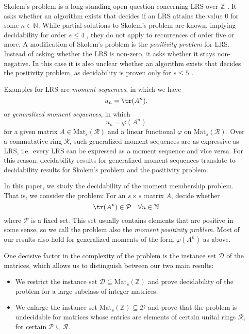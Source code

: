 Skolem's problem is a long-standing open question concerning LRS over $\mathbb{Z}$ \cite{Ou12}. It asks whether an algorithm exists that decides if an LRS attains the value $0$ for some $n \in \mathbb{N}$.
While partial solutions to Skolem's problem are known, implying decidability for order $s \leqslant 4$ \cite{Ti84, Ve85}, they do not apply to recurrences of order five or more.
A modification of Skolem's problem is the \emph{positivity problem} for LRS. Instead of asking whether the LRS is non-zero, it asks whether it stays non-negative.
In this case it is also unclear whether an algorithm exists that decides the positivity problem, as decidability is proven only for $s \leqslant 5$ \cite{OW, OW2}.

Examples for LRS are \emph{moment sequences}, in which we have 
$$ 
u_n = \tr(A^n),
$$
or \emph{generalized moment sequences}, in which $$u_n=\varphi(A^n)$$ 
for a given matrix $A \in \mathrm{Mat}_s(\mathcal{R})$ and a linear functional  $\varphi$ on $\mathrm{Mat}_s(\mathcal R)$.
Over a commutative ring $\mathcal R$, such generalized moment sequences are as expressive as LRS, i.e.\ every LRS can be expressed as a moment sequence and vice versa. For this reason, decidability results for generalized  moment sequences translate to decidability results for Skolem's problem and the positivity problem. 

In this paper, we study the decidability of the moment membership problem. 
That is, we consider the problem: For an $s \times s$ matrix $A$, decide whether 
$$ 
 \tr(A^n) \in \mathcal{P} \quad  \forall n\in \mathbb{N}
$$
where $\mathcal{P}$ is a fixed set. This set usually contains elements that are positive in some sense, so we call the problem also the \emph{moment positivity problem}. Most of our results also hold for generalized moments of the form $\varphi(A^n)$ as above.

One decisive factor in the complexity of the problem is the instance set $\mathcal{D}$ of the matrices, which allows us to distinguish between our two main results: 
\begin{itemize}
	\item We restrict the instance set $\mathcal{D} \subseteq \mathrm{Mat}_s(\mathbb{Z})$ and prove decidability of the problem for a large subclass of integer matrices.
	\item We enlarge the instance set $\mathrm{Mat}_s(\mathbb{Z}) \subseteq \mathcal{D}$ and prove that the problem is undecidable 
for	matrices whose entries are elements of certain unital rings $\mathcal{R},$ for certain $\mathcal{P} \subseteq \mathcal{R}$.
\end{itemize}

